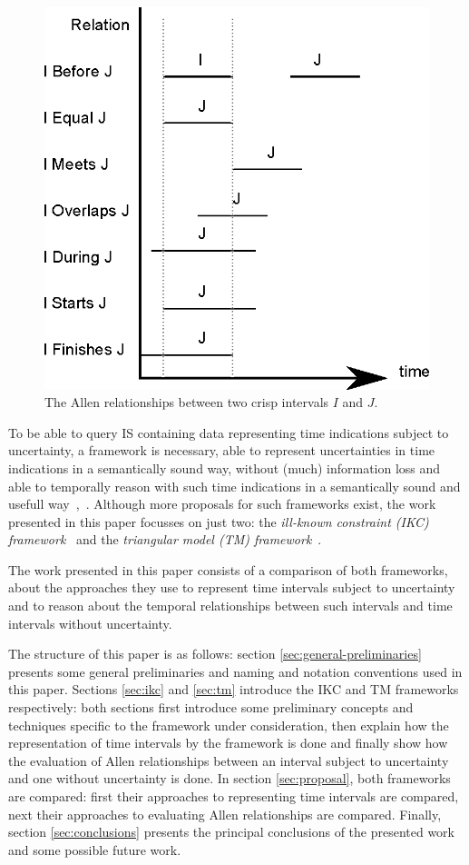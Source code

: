 \begin{figure}[h]
   \centering
   \includegraphics[width=0.9\columnwidth]{graphs/allen.eps}
   \caption{The Allen relationships between two crisp intervals $I$ and $J$.  }
   \label{fig:allen-relationships}
 \end{figure}

To be able to query IS containing data representing time indications subject to uncertainty, a framework is necessary, able to represent uncertainties in time indications in a semantically sound way, without (much) information loss and able to temporally reason with such time indications in a semantically sound and usefull way~\cite{Dubois1983},~\cite{Dubois2003}. Although more proposals for such frameworks exist, the work presented in this paper focusses on just two: the \emph{ill-known constraint \emph{(IKC)} framework}~\cite{Pons2011} and the \emph{triangular model \emph{(TM)} framework}~\cite{DeTre2012}.

The work presented in this paper consists of a comparison of both frameworks, about the approaches they use to represent time intervals subject to uncertainty and to reason about the temporal relationships between such intervals and time intervals without uncertainty.

The structure of this paper is as follows: section \ref{sec:general-preliminaries} presents some general preliminaries and naming and notation conventions used in this paper. Sections \ref{sec:ikc} and \ref{sec:tm} introduce the IKC and TM frameworks respectively: both sections first introduce some preliminary concepts and techniques specific to the framework under consideration, then explain how the representation of time intervals by the framework is done and finally show how the evaluation of Allen relationships between an interval subject to uncertainty and one without uncertainty is done. In section \ref{sec:proposal}, both frameworks are compared: first their approaches to representing time intervals are compared, next their approaches to evaluating Allen relationships are compared. Finally, section \ref{sec:conclusions} presents the principal conclusions of the presented work and some possible future work. 

